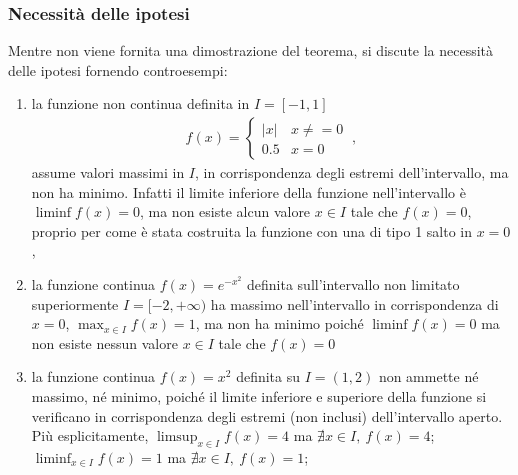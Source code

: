 \documentclass[letterpaper,10pt,italian]{jupyterBook}
\begin{document}
\subsubsection*{Necessità delle ipotesi}

\sphinxAtStartPar
Mentre non viene fornita una dimostrazione del teorema, si discute la necessità delle ipotesi fornendo controesempi:
\begin{enumerate}
%
\item {} 
\sphinxAtStartPar
la funzione non continua definita in \(I = [-1,1]\)
\begin{equation*}
\begin{split}f(x) = \begin{cases} |x| & x \ne = 0 \\ 0.5 & x = 0 \end{cases} \ ,\end{split}
\end{equation*}
\sphinxAtStartPar
assume valori massimi in \(I\), in corrispondenza degli estremi dell’intervallo, ma non ha minimo. Infatti il limite inferiore della funzione nell’intervallo è \(\liminf f(x) = 0\), ma non esiste alcun valore \(x \in I\) tale che \(f(x) = 0\), proprio per come è stata costruita la funzione con una  di tipo 1 \sphinxhyphen{} salto in \(x = 0\),

\item {} 
\sphinxAtStartPar
la funzione continua \(f(x) = e^{-x^2}\) definita sull’intervallo non limitato superiormente \(I = [-2, +\infty)\) ha massimo nell’intervallo in corrispondenza di \(x = 0\), \(\max_{x \in I} f(x) = 1\), ma non ha minimo poiché \(\liminf f(x) = 0\) ma non esiste nessun valore \(x \in I\) tale che \(f(x) = 0\)

\item {} 
\sphinxAtStartPar
la funzione continua \(f(x) = x^2\) definita su \(I = (1,2)\) non ammette né massimo, né minimo, poiché il limite inferiore e superiore della funzione si verificano in corrispondenza degli estremi (non inclusi) dell’intervallo aperto. Più esplicitamente, \(\limsup_{x\in I} f(x) = 4\) ma \(\nexists x \in I, \ f(x) = 4\); \(\liminf_{x\in I} f(x) = 1\) ma \(\nexists x \in I, \ f(x) = 1\);

\end{enumerate}
\end{document}
